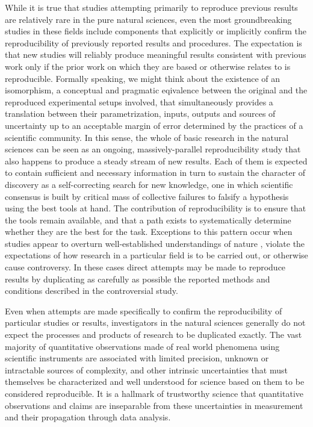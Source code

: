 While it is true that studies attempting primarily to reproduce previous results are relatively rare in the
	pure natural sciences, even the most groundbreaking studies in these fields include components
	that explicitly or implicitly confirm the reproducibility of previously reported results and procedures.
The expectation is that new studies will reliably produce meaningful results consistent with previous work
	only if the prior work on which they are based or otherwise relates to is reproducible.
Formally speaking, we might think about the existence of an isomorphism, a conceptual and
    pragmatic eqivalence between the original and the reproduced experimental setups involved,
    that simultaneously provides a translation between their parametrization, inputs, outputs
    and sources of uncertainty up to an acceptable margin of error determined by the practices
    of a scientific community.
In this sense, the whole of basic research in the natural sciences can be seen as an ongoing, massively-parallel
	reproducibility study that also happens to produce a steady stream of new results.
Each of them is expected to contain sufficient and necessary information in turn to sustain
    the character of discovery as a self-correcting search for new knowledge, one in which
    scientific consensus is built by critical mass of collective failures to falsify a
    hypothesis using the best tools at hand. The contribution of reproducibility is to ensure
    that the tools remain available, and that a path exists to systematically determine whether
    they are the best for the task.
Exceptions to this pattern occur when studies appear to overturn
well-established understandings of nature \cite{kuhn1962structure},
	violate the expectations of how research in a particular field is to be carried out, or otherwise cause controversy.
In these cases direct attempts may be made to reproduce results by duplicating as carefully as possible
	the reported methods and conditions described in the controversial study.

Even when attempts are made specifically to confirm the reproducibility of particular studies or results, investigators in
	the natural sciences generally do not expect the processes and products of research to be duplicated exactly.
The vast majority of quantitative observations made of real world phenomena using scientific instruments
	are associated with limited precision, unknown or intractable sources of complexity,
    and other intrinsic uncertainties that must themselves be characterized
	and well understood for science based on them to be considered reproducible.
It is a hallmark of trustworthy science that quantitative observations and claims are inseparable from these
	uncertainties in measurement and their propagation through data analysis.

